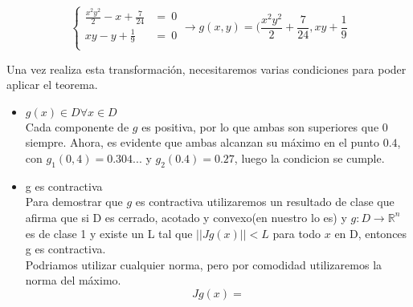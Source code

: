 \documentclass[11pt]{article}
\begin{document}
$$\begin{cases}
\frac{x^2y^2}{2} - x + \frac{7}{24} &= \ 0 \\
xy - y + \frac{1}{9} &= \ 0\\
\end{cases} \longrightarrow g(x,y) = (\frac{x^2y^2}{2} + \frac{7}{24}, xy +
\frac{1}{9} $$

Una vez realiza esta transformación, necesitaremos varias condiciones para poder
aplicar el teorema.
\begin{itemize}
        \item $g(x) \in D \forall x \in D$\\
        Cada componente de $g$ es positiva, por lo que ambas son superiores que
        $0$ siempre. Ahora, es evidente que ambas alcanzan su máximo en el punto
        $0.4$, con $g_1(0,4) = 0.304...$ y $g_2(0.4) = 0.27$, luego la condicion
        se cumple.
        \item g es contractiva\\
        Para demostrar que $g$ es contractiva utilizaremos un resultado de clase
        que afirma que si D es cerrado, acotado y convexo(en nuestro lo es) y
        $g:D \rightarrow  \mathbb{R}^n $ es de clase 1 y existe un L tal que
        $||Jg(x)|| < L$ para todo $x$ en D, entonces g es contractiva.\\
        Podriamos utilizar cualquier norma, pero por comodidad utilizaremos la
        norma del máximo.
        $$Jg(x) =
        $$
\end{itemize}
\end{document}
